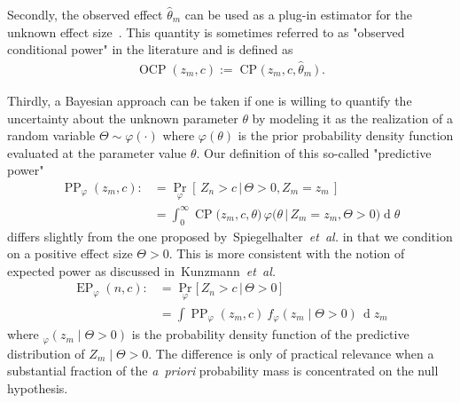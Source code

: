 \documentclass[12pt]{article}
\renewcommand{\Pr}{\operatorname{Pr}}
\newcommand{\etal}{\textit{et~al.}}
\newcommand{\CP}{\ensuremath{\operatorname{CP}}}
\newcommand{\OCP}{\ensuremath{\operatorname{OCP}}}
\newcommand{\PP}{\ensuremath{\operatorname{PP}}}
\newcommand{\EP}{\ensuremath{\operatorname{EP}}}
\renewcommand{\Pr}{\ensuremath{\operatorname{Pr}}}
\newcommand{\cond}{\ensuremath{\,|\,}}
\begin{document}
Secondly, the observed effect $\widehat{\theta}_m$ can be used
as a plug-in estimator for the unknown effect size~\cite{proschan1995}.
This quantity is sometimes referred to as "observed conditional power"
in the literature and is defined as
\begin{align}
    \OCP(z_m, c) := \CP\big(\, z_m, c, \widehat{\theta}_m \,\big) \ .
\end{align}

Thirdly, a Bayesian approach can be taken if one
is willing to quantify the uncertainty about the unknown parameter $\theta$ by modeling it as the
realization of a random variable $\Theta\sim\varphi(\cdot)$ where $\varphi(\theta)$ is the
prior probability density function evaluated at the parameter value $\theta$.
Our definition of this so-called "predictive power"
\begin{align}
    \PP_\varphi(z_m,c) :&= \Pr_\varphi[\,Z_n > c \cond \Theta >0, Z_m = z_m\,] \\
    &= \int_{0}^{\infty}\CP\big(z_m, c, \theta\big)\,\varphi\big(\theta\cond Z_m=z_m, \Theta>0\big)\operatorname{d}\theta
\end{align}
differs slightly from the one proposed by~Spiegelhalter~\etal\cite{spiegelhalter1994}
in that we condition on a positive effect size $\Theta>0$.
This is more consistent with the notion of expected power as discussed in~Kunzmann~\etal\cite{kunzmann2020}
\begin{align}
    \EP_\varphi(n, c) :&=
    \Pr_\varphi\big[\,Z_n>c\,|\,\Theta>0\,\big]\\
    &= \int \PP_\varphi(z_m,c)\ f_\varphi(z_m\mid \Theta>0) \,\operatorname{d}z_m
\end{align}
where $_\varphi(z_m\mid \Theta>0)$ is the probability density function of the predictive distribution of $Z_m\mid \Theta>0$.
The difference is
only of practical relevance when a substantial
fraction of the \textit{a~priori} probability mass is concentrated on the null hypothesis.
\end{document}
